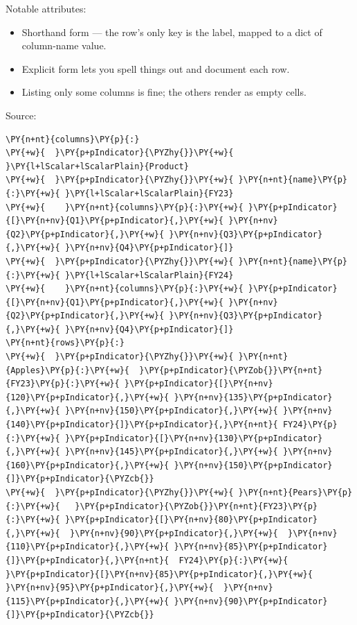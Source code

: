 \documentclass[a4paper,twoside]{article}
\begin{document}
Notable attributes:
\begin{itemize}
\item Shorthand form  --- the row's only key
is the label, mapped to a dict of column-name value.
\item Explicit form  lets you spell things out and
document each row.
\item Listing only some columns is fine; the others render as empty cells.
\end{itemize}
Source:
\begin{tscode}[lang=yaml, engine=pygments]
\begin{Verbatim}[commandchars=\\\{\},breaklines, breakanywhere, commandchars=\\\{\}]
\PY{n+nt}{columns}\PY{p}{:}
\PY{+w}{  }\PY{p+pIndicator}{\PYZhy{}}\PY{+w}{ }\PY{l+lScalar+lScalarPlain}{Product}
\PY{+w}{  }\PY{p+pIndicator}{\PYZhy{}}\PY{+w}{ }\PY{n+nt}{name}\PY{p}{:}\PY{+w}{ }\PY{l+lScalar+lScalarPlain}{FY23}
\PY{+w}{    }\PY{n+nt}{columns}\PY{p}{:}\PY{+w}{ }\PY{p+pIndicator}{[}\PY{n+nv}{Q1}\PY{p+pIndicator}{,}\PY{+w}{ }\PY{n+nv}{Q2}\PY{p+pIndicator}{,}\PY{+w}{ }\PY{n+nv}{Q3}\PY{p+pIndicator}{,}\PY{+w}{ }\PY{n+nv}{Q4}\PY{p+pIndicator}{]}
\PY{+w}{  }\PY{p+pIndicator}{\PYZhy{}}\PY{+w}{ }\PY{n+nt}{name}\PY{p}{:}\PY{+w}{ }\PY{l+lScalar+lScalarPlain}{FY24}
\PY{+w}{    }\PY{n+nt}{columns}\PY{p}{:}\PY{+w}{ }\PY{p+pIndicator}{[}\PY{n+nv}{Q1}\PY{p+pIndicator}{,}\PY{+w}{ }\PY{n+nv}{Q2}\PY{p+pIndicator}{,}\PY{+w}{ }\PY{n+nv}{Q3}\PY{p+pIndicator}{,}\PY{+w}{ }\PY{n+nv}{Q4}\PY{p+pIndicator}{]}
\PY{n+nt}{rows}\PY{p}{:}
\PY{+w}{  }\PY{p+pIndicator}{\PYZhy{}}\PY{+w}{ }\PY{n+nt}{Apples}\PY{p}{:}\PY{+w}{  }\PY{p+pIndicator}{\PYZob{}}\PY{n+nt}{FY23}\PY{p}{:}\PY{+w}{ }\PY{p+pIndicator}{[}\PY{n+nv}{120}\PY{p+pIndicator}{,}\PY{+w}{ }\PY{n+nv}{135}\PY{p+pIndicator}{,}\PY{+w}{ }\PY{n+nv}{150}\PY{p+pIndicator}{,}\PY{+w}{ }\PY{n+nv}{140}\PY{p+pIndicator}{]}\PY{p+pIndicator}{,}\PY{n+nt}{ FY24}\PY{p}{:}\PY{+w}{ }\PY{p+pIndicator}{[}\PY{n+nv}{130}\PY{p+pIndicator}{,}\PY{+w}{ }\PY{n+nv}{145}\PY{p+pIndicator}{,}\PY{+w}{ }\PY{n+nv}{160}\PY{p+pIndicator}{,}\PY{+w}{ }\PY{n+nv}{150}\PY{p+pIndicator}{]}\PY{p+pIndicator}{\PYZcb{}}
\PY{+w}{  }\PY{p+pIndicator}{\PYZhy{}}\PY{+w}{ }\PY{n+nt}{Pears}\PY{p}{:}\PY{+w}{   }\PY{p+pIndicator}{\PYZob{}}\PY{n+nt}{FY23}\PY{p}{:}\PY{+w}{ }\PY{p+pIndicator}{[}\PY{n+nv}{80}\PY{p+pIndicator}{,}\PY{+w}{  }\PY{n+nv}{90}\PY{p+pIndicator}{,}\PY{+w}{  }\PY{n+nv}{110}\PY{p+pIndicator}{,}\PY{+w}{ }\PY{n+nv}{85}\PY{p+pIndicator}{]}\PY{p+pIndicator}{,}\PY{n+nt}{  FY24}\PY{p}{:}\PY{+w}{ }\PY{p+pIndicator}{[}\PY{n+nv}{85}\PY{p+pIndicator}{,}\PY{+w}{  }\PY{n+nv}{95}\PY{p+pIndicator}{,}\PY{+w}{  }\PY{n+nv}{115}\PY{p+pIndicator}{,}\PY{+w}{ }\PY{n+nv}{90}\PY{p+pIndicator}{]}\PY{p+pIndicator}{\PYZcb{}}

\end{Verbatim}
\end{tscode}
\end{document}
